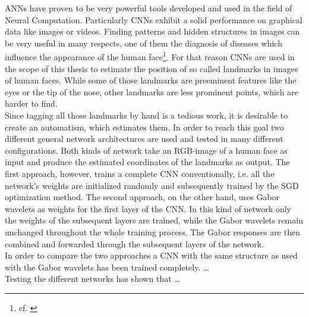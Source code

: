 \documentclass[11pt, a4paper]{article}
\begin{document}
\acp{ANN} have proven to be very powerful tools developed and used in the field of Neural Computation. Particularly \acp{CNN} exhibit a solid performance on graphical data like images or videos. Finding patterns and hidden structures in images can be very useful in many respects, one of them the diagnosis of diseases which influence the appearance of the human face\footnote{cf. \cite{ebgm}}. For that reason \acp{CNN} are used in the scope of this thesis to estimate the position of so called landmarks in images of human faces. While some of those landmarks are preeminent features like the eyes or the tip of the nose, other landmarks are less prominent points, which are harder to find.\\
Since tagging all those landmarks by hand is a tedious work, it is desirable to create an automatism, which estimates them. In order to reach this goal two different general network architectures are used and tested in many different configurations. Both kinds of network take an RGB-image of a human face as input and produce the estimated coordinates of the landmarks as output. The first approach, however, trains a complete \ac{CNN} conventionally, i.e. all the network's weights are initialized randomly and subsequently trained by the \ac{SGD} optimization method. The second approach, on the other hand, uses Gabor wavelets as weights for the first layer of the \ac{CNN}. In this kind of network only the weights of the subsequent layers are trained, while the Gabor wavelets remain unchanged throughout the whole training process. The Gabor responses are then combined and forwarded through the subsequent layers of the network.\\
In order to compare the two approaches a \ac{CNN} with the same structure as used with the Gabor wavelets has been trained completely. \dots\\%
Testing the different networks has shown that \dots%

\newpage

\end{document}

